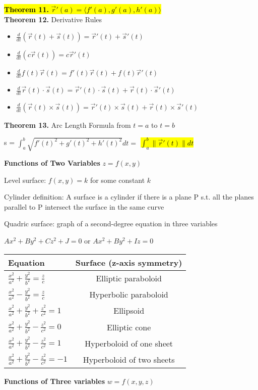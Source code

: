 \documentclass{article}
\newcommand{\headingsmall}[1]{{\small\textbf{#1}}}
\def\*#1{\vec{#1}}
\begin{document}
\begin{multicols*}{4}
\hl{\textbf{Theorem 11.} $\*r'(a)=\langle f'(a),g'(a),h'(a)\rangle$}\\
\textbf{Theorem 12.} Derivative Rules
\begin{itemize}[nosep]
	\item $\frac{d}{dt}(\*r(t)+\*s(t))=\*r'(t)+\*s'(t)$
	\item $\frac{d}{dt}(c\*r(t))=c\*r'(t)$
	\item $\frac{d}{dt}f(t)\*r(t)=f'(t)\*r(t)+f(t)\*r'(t)$
	\item $\frac{d}{dt}\*r(t)\cdot\*s(t)=\*r'(t)\cdot\*s(t)+\*r(t)\cdot\*s'(t)$
	\item $\frac{d}{dt}(\*r(t)\times\*s(t))=\*r'(t)\times\*s(t)+\*r(t)\times\*s'(t)$
\end{itemize}

\textbf{Theorem 13.} Arc Length Formula from $t=a$ to $t=b$

s = $\int_a^b \sqrt{f'(t)^2+g'(t)^2+h'(t)^2} dt=$ \hl{$\int_a^b \|\*r'(t)\|dt$}

\headingsmall{Functions of Two Variables} $z=f(x,y)$

Level surface: $f(x,y)=k$ for some constant $k$

Cylinder definition: A surface is a cylinder if there is a plane P s.t. all the planes parallel to P intersect the surface in the same curve

Quadric surface: graph of a second-degree equation in three variables

$Ax^2+By^2+Cz^2+J=0$ or $Ax^2+By^2+Iz=0$
\begin{center}
\renewcommand{\arraystretch}{2}
\begin{tabular}{|l|c|}	
	\hline
    Equation  & Surface (z-axis symmetry)\\\hline
    $\frac{x^2}{a^2}+\frac{y^2}{b^2}=\frac{z}{c}$ & Elliptic paraboloid   \\\hline
    $\frac{x^2}{a^2}-\frac{y^2}{b^2}=\frac{z}{c}$ & Hyperbolic paraboloid \\\hline
    $\frac{x^2}{a^2}+\frac{y^2}{b^2}+\frac{z^2}{c^2}=1$ & Ellipsoid \\\hline
    $\frac{x^2}{a^2}+\frac{y^2}{b^2}-\frac{z^2}{c^2}=0$ & Elliptic cone \\\hline
    $\frac{x^2}{a^2}+\frac{y^2}{b^2}-\frac{z^2}{c^2}=1$ & Hyperboloid of one sheet\\\hline
    $\frac{x^2}{a^2}+\frac{y^2}{b^2}-\frac{z^2}{c^2}=-1$ & Hyperboloid of two sheets\\\hline
\end{tabular}\end{center}
\headingsmall{Functions of Three variables} $w=f(x,y,z)$


\end{multicols*}
\end{document}

